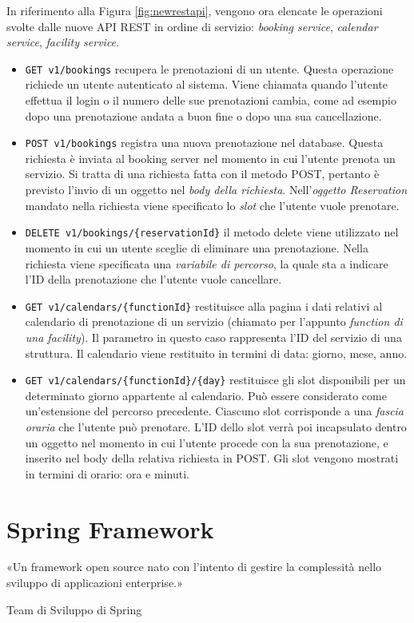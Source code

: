 In riferimento alla Figura \ref{fig:newrestapi}, vengono ora elencate le operazioni svolte dalle nuove API REST in ordine di servizio: \emph{booking service}, \emph{calendar service}, \emph{facility service}.
\begin{itemize}
    \item \texttt{GET v1/bookings} recupera le prenotazioni di un utente. Questa operazione richiede un utente autenticato al sistema. Viene chiamata quando l'utente effettua il login o il numero delle sue prenotazioni cambia, come ad esempio dopo una prenotazione andata a buon fine o dopo una sua cancellazione.
    \item \texttt{POST v1/bookings} registra una nuova prenotazione nel database. Questa richiesta è inviata al booking server nel momento in cui l'utente prenota un servizio. Si tratta di una richiesta fatta con il metodo POST, pertanto è previsto l'invio di un oggetto nel \emph{body della richiesta}. Nell'\emph{oggetto Reservation} mandato nella richiesta viene specificato lo \emph{slot} che l'utente vuole prenotare.
    \item \texttt{DELETE v1/bookings/\{reservationId\}} il metodo delete viene utilizzato nel momento in cui un utente sceglie di eliminare una prenotazione. Nella richiesta viene specificata una \emph{variabile di percorso}, la quale sta a indicare l'ID della prenotazione che l'utente vuole cancellare.
    \item \texttt{GET v1/calendars/\{functionId\}} restituisce alla pagina i dati relativi al calendario di prenotazione di un servizio (chiamato per l'appunto \emph{function di una facility}). Il parametro in questo caso rappresenta l'ID del servizio di una struttura. Il calendario viene restituito in termini di data: giorno, mese, anno.
    \item \texttt{GET v1/calendars/\{functionId\}/\{day\}} restituisce gli slot disponibili per un determinato giorno appartente al calendario. Può essere considerato come un'estensione del percorso precedente. Ciascuno slot corrisponde a una \emph{fascia oraria} che l'utente può prenotare. L'ID dello slot verrà poi incapsulato dentro un oggetto nel momento in cui l'utente procede con la sua prenotazione, e inserito nel body della relativa richiesta in POST. Gli slot vengono mostrati in termini di orario: ora e minuti. 
\end{itemize}

\section{Spring Framework}
\epigraph{«Un framework open source nato con l’intento di gestire la complessità nello sviluppo di applicazioni enterprise.»}{Team di Sviluppo di Spring}


